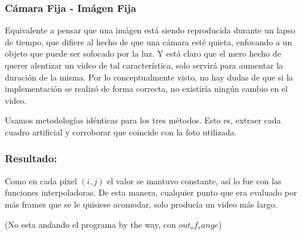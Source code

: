 \subsubsection{C\'amara Fija - Im\'agen Fija}

Equivalente a pensar que una im\'agen est\'a siendo reproducida durante un lapso de tiempo, que difiere al hecho de que una c\'amara est\'e quieta, enfocando a un objeto que puede ser sofocado por la luz. Y est\'a claro que el mero hecho de querer alentizar un video de tal caracter\'istica, solo servir\'a para aumentar la duraci\'on de la misma. Por lo conceptualmente visto, no hay dudas de que si la implementaci\'on se realiz\'o de forma correcta, no existir\'ia ning\'un cambio en el video.

Usamos metodolog\'ias id\'enticas para los tres m\'etodos. Esto es, extraer cada cuadro artificial y corroborar que coincide con la foto utilizada.

\subsubsection*{\bf{Resultado:}}

Como en cada p\'ixel $(i,j)$ el valor se mantuvo constante, as\'i lo fue con las funciones interpoladoras. De esta manera, cualquier punto que era evaluado por m\'as frames que se le quisiese acomodar, solo produc\'ia un video m\'as largo.

(No esta andando el programa by the way, con $out_of_range$) 